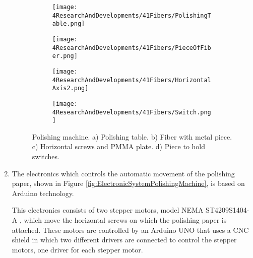 \begin{enumerate}
\begin{figure}
\centering
    \begin{subfigure}[b]{0.55\textwidth}
    \centering
    \texttt{[image: 4ResearchAndDevelopments/41Fibers/PolishingTable.png]}  
    \caption{\label{subfig:PolishingTable}}
    \end{subfigure}
    \hfill
    \begin{subfigure}[b]{0.3\textwidth}
    \centering
    \texttt{[image: 4ResearchAndDevelopments/41Fibers/PieceOfFiber.png]}  
    \caption{\label{subfig:FiberMetailcPiece}}
    \end{subfigure}
    \hfill
    \begin{subfigure}[b]{0.55\textwidth}
    \centering
    \texttt{[image: 4ResearchAndDevelopments/41Fibers/HorizontalAxis2.png]}  
    \caption{\label{subfig:HorizontalAxis}}
    \end{subfigure}
    \hfill
    \begin{subfigure}[b]{0.4\textwidth}
    \centering
    \texttt{[image: 4ResearchAndDevelopments/41Fibers/Switch.png]}  
    \caption{\label{subfig:3DSwitchPiece}}
    \end{subfigure}
 \caption{Polishing machine. a) Polishing table. b) Fiber with metal piece. c) Horizontal screws and PMMA plate. d) Piece to hold switches.}
 \label{fig:PolishingTable}
\end{figure}

\item{} The electronics which controls the automatic movement of the polishing paper, shown in Figure \ref{fig:ElectronicSystemPolishingMachine}, is based on Arduino technology.

This electronics consists of two stepper motors, model NEMA ST4209S1404-A \cite{StepperMotors}, which move the horizontal screws on which the polishing paper is attached. These motors are controlled by an Arduino UNO \cite{ArduinoUNO} that uses a CNC shield \cite{CNCShield} in which two different drivers are connected to control the stepper motors, one driver for each stepper motor.


\end{enumerate}
